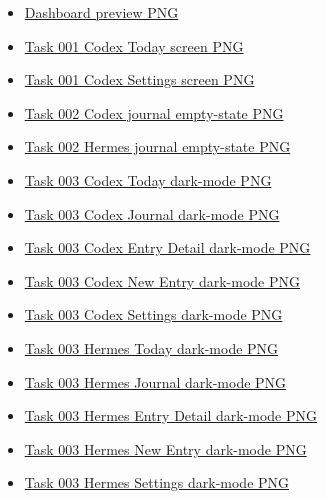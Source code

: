\documentclass[11pt]{article}
\newcommand{\repourl}[1]{https://github.com/Rezatachi/TasteBench/blob/main/#1}
\newcommand{\pngsource}[2]{\href{\repourl{#1}}{\scriptsize\textcolor{TasteMuted}{#2}}}
\begin{document}
\begin{itemize}
  \item \pngsource{reports/assets/dashboard-preview.png}{Dashboard preview PNG}
  \item \pngsource{runs/codex/001-add-settings-screen/screenshots/result-light-today.png}{Task 001 Codex Today screen PNG}
  \item \pngsource{runs/codex/001-add-settings-screen/screenshots/result-light-settings.png}{Task 001 Codex Settings screen PNG}
  \item \pngsource{runs/codex/002-journal-empty-state/screenshots/result-light-journal-empty.png}{Task 002 Codex journal empty-state PNG}
  \item \pngsource{runs/hermes/002-journal-empty-state/screenshots/result-light-journal-empty.png}{Task 002 Hermes journal empty-state PNG}
  \item \pngsource{runs/codex/003-dark-mode-fidelity/screenshots/result-dark-today.png}{Task 003 Codex Today dark-mode PNG}
  \item \pngsource{runs/codex/003-dark-mode-fidelity/screenshots/result-dark-journal.png}{Task 003 Codex Journal dark-mode PNG}
  \item \pngsource{runs/codex/003-dark-mode-fidelity/screenshots/result-dark-entry-detail.png}{Task 003 Codex Entry Detail dark-mode PNG}
  \item \pngsource{runs/codex/003-dark-mode-fidelity/screenshots/result-dark-new-entry.png}{Task 003 Codex New Entry dark-mode PNG}
  \item \pngsource{runs/codex/003-dark-mode-fidelity/screenshots/result-dark-settings.png}{Task 003 Codex Settings dark-mode PNG}
  \item \pngsource{runs/hermes/003-dark-mode-fidelity/screenshots/result-dark-today.png}{Task 003 Hermes Today dark-mode PNG}
  \item \pngsource{runs/hermes/003-dark-mode-fidelity/screenshots/result-dark-journal.png}{Task 003 Hermes Journal dark-mode PNG}
  \item \pngsource{runs/hermes/003-dark-mode-fidelity/screenshots/result-dark-entry-detail.png}{Task 003 Hermes Entry Detail dark-mode PNG}
  \item \pngsource{runs/hermes/003-dark-mode-fidelity/screenshots/result-dark-new-entry.png}{Task 003 Hermes New Entry dark-mode PNG}
  \item \pngsource{runs/hermes/003-dark-mode-fidelity/screenshots/result-dark-settings.png}{Task 003 Hermes Settings dark-mode PNG}
\end{itemize}
\end{document}
